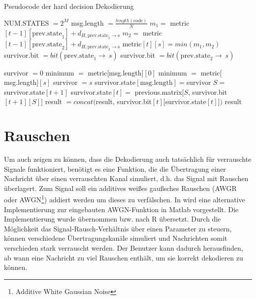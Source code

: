\begin{algorithm}[H]
\renewcommand{\algorithmicforall}{\textbf{for each}}
\caption{Pseudocode der hard decision Dekodierung}
\label{algorithmus:dekodierung}
\begin{algorithmic}[1]
\STATE NUM.STATES $=2^{M}$
\STATE msg.length $=\frac{\mathit{length}(\mathrm{code})}{N}$
   	\STATE $m_{1}=$ metric$[t-1][\mathrm{prev.state}_1] + d_{H, \mathrm{prev.state}_1\rightarrow \mathrm{s}}$
   	\STATE $m_{2}=$ metric$[t-1][\mathrm{prev.state}_2] + d_{H, \mathrm{prev.state}_2\rightarrow \mathrm{s}}$
      \STATE metric$[t][s]=\mathit{min}(m_{1},m_{2})$
      	\STATE survivor.bit $=\mathit{bit}(\mathrm{prev.state}_1\rightarrow\ s)$
      \ELSE
      	\STATE survivor.bit $=\mathit{bit}(\mathrm{prev.state}_2\rightarrow\ s)$
      \ENDIF
	\ENDFOR
\ENDFOR

	\STATE survivor $=0$
\ELSE
	\STATE minimum $=$ metric$[$msg.length$][0]$
			\STATE minimum $=$ metric$[$msg.length$][s]$
			\STATE survivor $=s$
		\ENDIF
	\ENDFOR
\ENDIF
\STATE survivor.state$[\mathrm{msg.length}]=$survivor
	\STATE $S=$survivor.state$[t+1]$
	\STATE survivor.state$[t]=$ previous.matrix$[S$, survivor.bit$[t+1][S]]$
\ENDFOR
{}
	\STATE result $=\mathit{concat}($result, survivor.bit$[t][$survivor.state$[t]])$
\ENDFOR
\RETURN result
\end{algorithmic}
\end{algorithm}

\section{Rauschen}
\label{kapitel:implementierung_noise}
Um auch zeigen zu können, dass die Dekodierung auch tatsächlich für verrauschte Signale funktioniert, benötigt es eine Funktion, die die Übertragung einer Nachricht über einen verrauschten Kanal simuliert, d.h. das Signal mit Rauschen überlagert. Zum Signal soll ein additives weißes gaußsches Rauschen (AWGR oder AWGN\footnote{Additive White Gaussian Noise}) addiert werden um dieses zu verfälschen. In \cite{AWGN} wird eine alternative Implementierung zur eingebauten AWGN-Funktion in Matlab vorgestellt. Die Implementierung wurde übernommen bzw. nach R übersetzt. Durch die Möglichkeit das Signal-Rausch-Verhältnis über einen Parameter zu steuern, können verschiedene Übertragungskanäle simuliert und Nachrichten somit verschieden stark verrauscht werden. Der Benutzer kann dadurch herausfinden, ab wann eine Nachricht zu viel Rauschen enthält, um sie korrekt dekodieren zu können.

